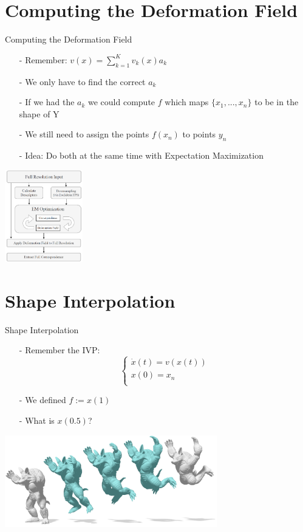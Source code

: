 \documentclass[xcolor=dvipsnames]{beamer}
\begin{document}
\section{Computing the Deformation Field}
\begin{frame}{Computing the Deformation Field}
\begin{enumerate}
\item[-] Remember: $v(x) = \sum_{k=1}^K v_k(x)a_k$
\item[-] We only have to find the correct $a_k$
\item[-] If we had the $a_k$ we could compute $f$ which maps $\{x_1,...,x_n\}$ to be in the shape of Y
\item[-] We still need to assign the points $f(x_n)$ to points $y_n$
\item[-] Idea: Do both at the same time with Expectation Maximization
\end{enumerate}
\begin{center}
\includegraphics[height=4cm]{Pictures/Pipeline.png}
\end{center}
\end{frame}

\section{Shape Interpolation}
\begin{frame}{Shape Interpolation}
\begin{enumerate}
\item[-] Remember the IVP: \begin{equation*}
  	\begin{cases}
    \dot{x}(t) = v(x(t)) \\
    x(0) = x_n \\
    \end{cases}
    \end{equation*}
\item[-] We defined $f:=x(1)$
\item[-] What is $x(0.5)$?
\pause
\end{enumerate}
\begin{center}
\includegraphics[height=4cm]{Pictures/Interpolation.png}
\end{center}
\end{frame}
\end{document}
